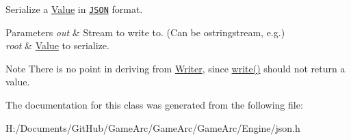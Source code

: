 Serialize a \hyperlink{class_json_1_1_value}{Value} in \href{http://www.json.org}{\tt J\+S\+O\+N} format. 


\begin{DoxyParams}{Parameters}
{\em out} & Stream to write to. (Can be ostringstream, e.\+g.) \\
\hline
{\em root} & \hyperlink{class_json_1_1_value}{Value} to serialize. \\
\hline
\end{DoxyParams}
\begin{DoxyNote}{Note}
There is no point in deriving from \hyperlink{class_json_1_1_writer}{Writer}, since \hyperlink{class_json_1_1_styled_stream_writer_a07807741c6c43ecd35885a87234d0805}{write()} should not return a value. 
\end{DoxyNote}


The documentation for this class was generated from the following file\+:\begin{DoxyCompactItemize}
\item 
H\+:/\+Documents/\+Git\+Hub/\+Game\+Arc/\+Game\+Arc/\+Game\+Arc/\+Engine/json.\+h\end{DoxyCompactItemize}
